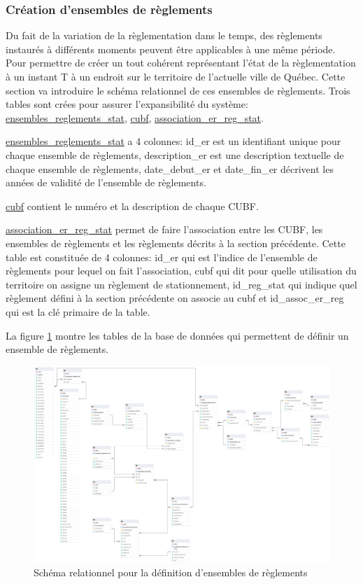     \subsubsection{Création d'ensembles de règlements}
    Du fait de la variation de la règlementation dans le temps, des règlements instaurés à différents moments peuvent être applicables à une même période. Pour permettre de créer un tout cohérent représentant l'état de la règlementation à un instant T à un endroit sur le territoire de l'actuelle ville de Québec. Cette section va introduire le schéma relationnel de ces ensembles de règlements. Trois tables sont crées pour assurer l'expansibilité du système: \underline{ensembles\_reglements\_stat}, \underline{cubf}, \underline{association\_er\_reg\_stat}.\par
    \underline{ensembles\_reglements\_stat} a 4 colonnes: id\_er est un identifiant unique pour chaque ensemble de règlements, description\_er est une description textuelle de chaque ensemble de règlements, date\_debut\_er et date\_fin\_er décrivent les années de validité de l'ensemble de règlements.\par
    \underline{cubf} contient le numéro et la description de chaque \acf{CUBF}.\par
    \underline{association\_er\_reg\_stat} permet de faire l'association entre les \ac{CUBF}, les ensembles de règlements et les règlements décrits à la section précédente. Cette table est constituée de 4 colonnes: id\_er qui est l'indice de l'ensemble de règlements pour lequel on fait l'association, cubf qui dit pour quelle utilisation du territoire on assigne un règlement de stationnement, id\_reg\_stat qui indique quel règlement défini à la section précédente on associe au cubf et id\_assoc\_er\_reg qui est la clé primaire de la table.\par
    La figure \ref{fig:offstreet_db_erd_rulesets} montre les tables de la base de données qui permettent de définir un ensemble de règlements.
    \begin{figure}[h]
        \centering
        \includegraphics[trim={16cm 22cm 55cm 24cm},clip,width=12.5cm]{images/structure_base_de_donnee.png}
        \caption{Schéma relationnel pour la définition d'ensembles de règlements}
        \label{fig:offstreet_db_erd_rulesets}
    \end{figure}
    \FloatBarrier

